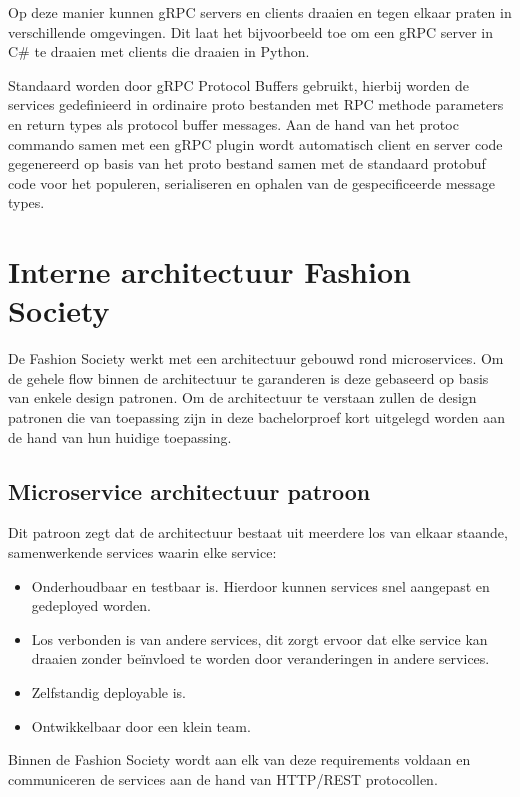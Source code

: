 Op deze manier kunnen gRPC servers en clients draaien en tegen elkaar praten in verschillende omgevingen. Dit laat het bijvoorbeeld toe om een gRPC server in C\# te draaien met clients die draaien in Python.

Standaard worden door gRPC Protocol Buffers gebruikt, hierbij worden de services gedefinieerd in ordinaire proto bestanden met RPC methode parameters en return types als protocol buffer messages. Aan de hand van het protoc commando samen met een gRPC plugin wordt automatisch client en server code gegenereerd op basis van het proto bestand samen met de standaard protobuf code voor het populeren, serialiseren en ophalen van de gespecificeerde message types.

\section{Interne architectuur Fashion Society}

De Fashion Society werkt met een architectuur gebouwd rond microservices. Om de gehele flow binnen de architectuur te garanderen is deze gebaseerd op basis van enkele design patronen. Om de architectuur te verstaan zullen de design patronen die van toepassing zijn in deze bachelorproef kort uitgelegd worden aan de hand van hun huidige toepassing.

\subsection{Microservice architectuur patroon}
\label{subsec:Microservice architectuur patroon}

Dit patroon zegt dat de architectuur bestaat uit meerdere los van elkaar staande, samenwerkende services waarin elke service:
 \begin{itemize}
     \item Onderhoudbaar en testbaar is. Hierdoor kunnen services snel aangepast en gedeployed worden.
     \item Los verbonden is van andere services, dit zorgt ervoor dat elke service kan draaien zonder beïnvloed te worden door veranderingen in andere services.
     \item Zelfstandig deployable is.
     \item Ontwikkelbaar door een klein team.
 \end{itemize}
\autocite{Richardsonc}

Binnen de Fashion Society wordt aan elk van deze requirements voldaan en communiceren de services aan de hand van HTTP/REST protocollen.

